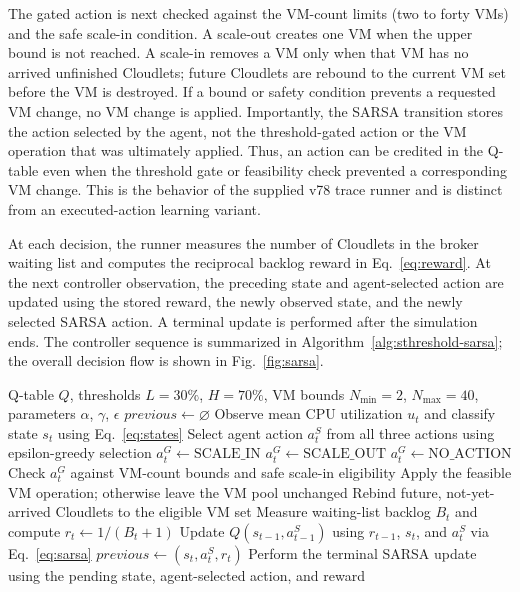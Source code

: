 \documentclass[pdflatex,sn-mathphys-num]{sn-jnl}
\begin{document}
The gated action is next checked against the VM-count limits (two to forty VMs) and the safe scale-in condition. A scale-out creates one VM when the upper bound is not reached. A scale-in removes a VM only when that VM has no arrived unfinished Cloudlets; future Cloudlets are rebound to the current VM set before the VM is destroyed. If a bound or safety condition prevents a requested VM change, no VM change is applied. Importantly, the SARSA transition stores the action selected by the agent, not the threshold-gated action or the VM operation that was ultimately applied. Thus, an action can be credited in the Q-table even when the threshold gate or feasibility check prevented a corresponding VM change. This is the behavior of the supplied v78 trace runner and is distinct from an executed-action learning variant.

At each decision, the runner measures the number of Cloudlets in the broker waiting list and computes the reciprocal backlog reward in Eq.~\ref{eq:reward}. At the next controller observation, the preceding state and agent-selected action are updated using the stored reward, the newly observed state, and the newly selected SARSA action. A terminal update is performed after the simulation ends. The controller sequence is summarized in Algorithm~\ref{alg:sthreshold-sarsa}; the overall decision flow is shown in Fig.~\ref{fig:sarsa}.

\begin{algorithm}[!htbp]
\caption{Trace-based S-Threshold+SARSA controller implemented in the v78 trace runner.}
\label{alg:sthreshold-sarsa}
\begin{algorithmic}[1]
\Require Q-table $Q$, thresholds $L=30\%$, $H=70\%$, VM bounds $N_{\min}=2$, $N_{\max}=40$, parameters $\alpha$, $\gamma$, $\epsilon$
\State $previous \gets \varnothing$
  \State Observe mean CPU utilization $u_t$ and classify state $s_t$ using Eq.~\ref{eq:states}
  \State Select agent action $a_t^{S}$ from all three actions using epsilon-greedy selection
    \State $a_t^{G} \gets \text{SCALE\_IN}$
    \State $a_t^{G} \gets \text{SCALE\_OUT}$
  \Else
    \State $a_t^{G} \gets \text{NO\_ACTION}$
  \EndIf
  \State Check $a_t^{G}$ against VM-count bounds and safe scale-in eligibility
  \State Apply the feasible VM operation; otherwise leave the VM pool unchanged
  \State Rebind future, not-yet-arrived Cloudlets to the eligible VM set
  \State Measure waiting-list backlog $B_t$ and compute $r_t \gets 1/(B_t+1)$
    \State Update $Q(s_{t-1},a_{t-1}^{S})$ using $r_{t-1}$, $s_t$, and $a_t^{S}$ via Eq.~\ref{eq:sarsa}
  \EndIf
  \State $previous \gets (s_t,a_t^{S},r_t)$
\EndFor
\State Perform the terminal SARSA update using the pending state, agent-selected action, and reward
\end{algorithmic}
\end{algorithm}
\end{document}
